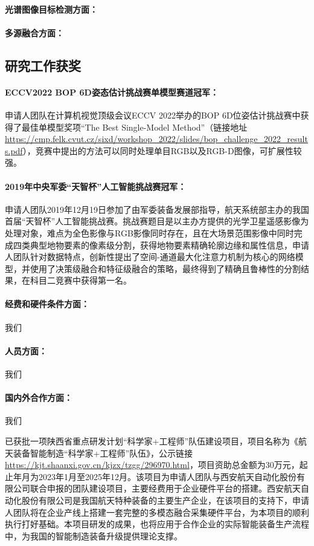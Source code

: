 \documentclass[12pt]{article}
\newcommand{\myPara}[1]{\paragraph{#1：}}
\begin{document}
\myPara{光谱图像目标检测方面}


\myPara{多源融合方面}



\subsection{研究工作获奖}

\myPara{ECCV2022 BOP 6D姿态估计挑战赛单模型赛道冠军}
申请人团队在计算机视觉顶级会议ECCV 2022举办的BOP 6D位姿估计挑战赛中获得了最佳单模型奖项“The Best Single-Model Method”（链接地址\url{https://cmp.felk.cvut.cz/sixd/workshop_2022/slides/bop_challenge_2022_results.pdf}），竞赛中提出的方法可以同时处理单目RGB以及RGB-D图像，可扩展性较强。

\myPara{2019年中央军委“天智杯”人工智能挑战赛冠军}
申请人团队2019年12月19日参加了由军委装备发展部指导，航天系统部主办的我国首届“天智杯”人工智能挑战赛。挑战赛题目是以主办方提供的光学卫星遥感影像为处理对象，难点为全色影像与RGB影像同时存在，且在大场景范围影像中同时完成四类典型地物要素的像素级分割，获得地物要素精确轮廓边缘和属性信息，申请人团队针对数据特点，创新性提出了空间-通道最大化注意力机制为核心的网络模型，并使用了决策级融合和特征级融合的策略，最终得到了精确且鲁棒性的分割结果，在科目二竞赛中获得第一名。



\myPara{经费和硬件条件方面}我们


\myPara{人员方面}我们

\myPara{国内外合作方面} 我们



已获批一项陕西省重点研发计划“科学家+工程师”队伍建设项目，项目名称为《航天装备智能制造“科学家+工程师”队伍》，公示链接\url{https://kjt.shaanxi.gov.cn/kjzx/tzgg/296970.html}，项目资助总金额为30万元，起止年月为2023年1月至2025年12月。该项目为申请人团队与西安航天自动化股份有限公司联合申报的团队建设项目，主要经费用于企业硬件平台的搭建。西安航天自动化股份有限公司是我国航天特种装备的主要生产企业，在该项目的支持下，申请人团队将在企业产线上搭建一套完整的多模态融合采集硬件平台，为本项目的顺利执行打好基础。本项目研发的成果，也将应用于合作企业的实际智能装备生产流程中，为我国的智能制造装备升级提供理论支撑。
\end{document}
